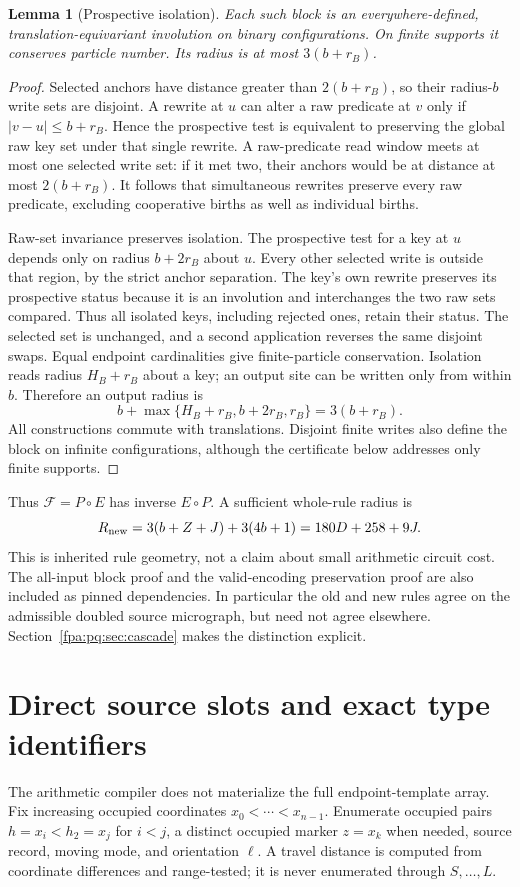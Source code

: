 \documentclass[11pt,a4paper]{article}
\numberwithin{equation}{section}
\newtheorem{lemma}[theorem]{Lemma}
\newcommand{\CA}{\mathcal F}\newcommand{\tabsize}{S_{\rm tab}}\newcommand{\Dv}{D_{\rm v}}
\begin{document}
\begin{lemma}[Prospective isolation]\label{fpa:pq:lem:parallel}
Each such block is an everywhere-defined, translation-equivariant involution on binary configurations. On finite supports it conserves particle number. Its radius is at most $3(b+r_B)$.
\end{lemma}
\begin{proof}
Selected anchors have distance greater than $2(b+r_B)$, so their radius-$b$ write sets are disjoint. A rewrite at $u$ can alter a raw predicate at $v$ only if $|v-u|\le b+r_B$. Hence the prospective test is equivalent to preserving the global raw key set under that single rewrite. A raw-predicate read window meets at most one selected write set: if it met two, their anchors would be at distance at most $2(b+r_B)$. It follows that simultaneous rewrites preserve every raw predicate, excluding cooperative births as well as individual births.

Raw-set invariance preserves isolation. The prospective test for a key at $u$ depends only on radius $b+2r_B$ about $u$. Every other selected write is outside that region, by the strict anchor separation. The key's own rewrite preserves its prospective status because it is an involution and interchanges the two raw sets compared. Thus all isolated keys, including rejected ones, retain their status. The selected set is unchanged, and a second application reverses the same disjoint swaps. Equal endpoint cardinalities give finite-particle conservation. Isolation reads radius $H_B+r_B$ about a key; an output site can be written only from within $b$. Therefore an output radius is
\[
b+\max\{H_B+r_B,b+2r_B,r_B\}=3(b+r_B).
\]
All constructions commute with translations. Disjoint finite writes also define the block on infinite configurations, although the certificate below addresses only finite supports.
\end{proof}

Thus $\CA=P\circ E$ has inverse $E\circ P$. A sufficient whole-rule radius is
\[
R_{\rm new}=3(b+Z+J)+3(4b+1)
=180D+258+9J.
\]
This is inherited rule geometry, not a claim about small arithmetic circuit cost. The all-input block proof and the valid-encoding preservation proof are also included as pinned dependencies. In particular the old and new rules agree on the admissible doubled source micrograph, but need not agree elsewhere. Section~\ref{fpa:pq:sec:cascade} makes the distinction explicit.

\section{Direct source slots and exact type identifiers}\label{fpa:pq:sec:slots}
The arithmetic compiler does not materialize the full endpoint-template array. Fix increasing occupied coordinates $x_0<\cdots<x_{n-1}$. Enumerate occupied pairs $h=x_i<h_2=x_j$ for $i<j$, a distinct occupied marker $z=x_k$ when needed, source record, moving mode, and orientation $\ell$. A travel distance is computed from coordinate differences and range-tested; it is never enumerated through $S,\ldots,L$.
\end{document}
